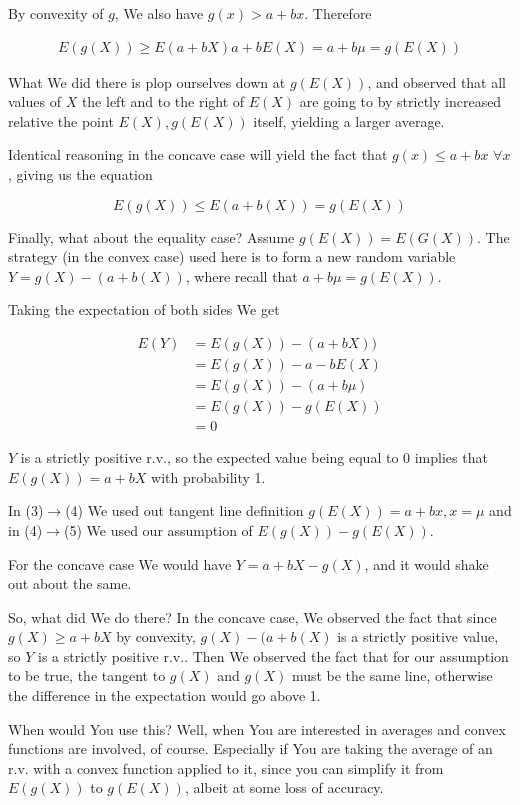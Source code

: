 \documentclass{article}
\begin{document}
		By convexity of $g$, We also have $g(x) > a+bx$. Therefore
		
		\begin{align*}
		E(g(X)) \ge E(a+bX) a + bE(X) = a+b\mu = g(E(X))
		\end{align*}
		
		What We did there is plop ourselves down at $g(E(X))$, and observed that all values of $X$ the left and to the right of $E(X)$ are going to by strictly increased relative the point $E(X), g(E(X))$ itself, yielding a larger average.
		
		Identical reasoning in the concave case will yield the fact that $g(x) \le a+bx$ $ \forall x$, giving us the equation
		
		\[ E(g(X))\le E(a+b(X)) = g(E(X)) \]
			
		Finally, what about the equality case? Assume $g(E(X)) = E(G(X))$. The strategy (in the convex case) used here is to form a new random variable $Y = g(X) -( a + b(X))$, where recall that $a+b\mu = g(E(X))$.
		
		Taking the expectation of both sides We get
		
		\begin{align}
		E(Y) &= E(g(X)) - (a+bX))\\
		&= E(g(X)) - a - bE(X)\\
		&= E(g(X)) - (a+b\mu)\\
		&= E(g(X)) - g(E(X))\\
		&= 0
		\end{align}
		
		$Y$ is a strictly positive r.v., so the expected value being equal to 0 implies that $E(g(X)) = a+bX$ with probability 1.		
		
		In (3)$\to$(4) We used out tangent line definition $g(E(X)) = a+bx, x=\mu$ and in (4)$\to$(5) We used our assumption of $E(g(X)) - g(E(X))$. 
		
		For the concave case We would have $Y=a+bX - g(X)$, and it would shake out about the same.
		
		So, what did We do there? In the concave case, We observed the fact that since $g(X) \ge a+bX$ by convexity, $g(X)-(a+b(X)$ is a strictly positive value, so $Y$ is a strictly positive r.v.. Then We observed the fact that for our assumption to be true, the tangent to $g(X)$ and $g(X)$ must be the same line, otherwise the difference in the expectation would go above 1.
		
		When would You use this? Well, when You are interested in averages and convex functions are involved, of course. Especially if You are taking the average of an r.v. with a convex function applied to it, since you can simplify it from $E(g(X))$ to $g(E(X))$, albeit at some loss of accuracy.
		
\end{document}
